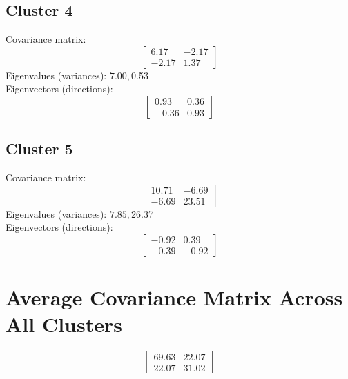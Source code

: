 \documentclass{article}
\begin{document}
\subsection*{Cluster 4}
Covariance matrix:
\[\begin{bmatrix}6.17 & -2.17 \\-2.17 & 1.37\end{bmatrix}\]
Eigenvalues (variances): $ 7.00, $0.53\\
Eigenvectors (directions):
\[\begin{bmatrix}0.93 & 0.36 \\-0.36 & 0.93\end{bmatrix}\]
\subsection*{Cluster 5}
Covariance matrix:
\[\begin{bmatrix}10.71 & -6.69 \\-6.69 & 23.51\end{bmatrix}\]
Eigenvalues (variances): $ 7.85, $26.37\\
Eigenvectors (directions):
\[\begin{bmatrix}-0.92 & 0.39 \\-0.39 & -0.92\end{bmatrix}\]
\section*{Average Covariance Matrix Across All Clusters}
\[\begin{bmatrix}69.63 & 22.07 \\22.07 & 31.02\end{bmatrix}\]
\end{document}
